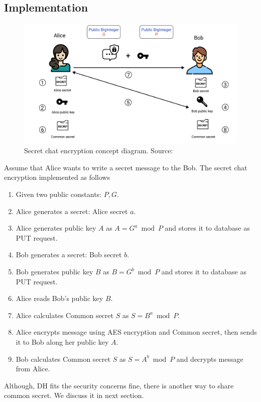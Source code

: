 \subsection{Implementation}\label{subsec:implementation}
\begin{figure}[H]
    \centering
    \includegraphics[width=1\textwidth]{Pictures/Key_Exchange}
    \caption{Secret chat encryption concept diagram. Source: }\label{fig:figure7}
\end{figure}
Assume that Alice wants to write a secret message to the Bob.
The secret chat encryption implemented as follows
\begin{enumerate}
    \item Given two public constants: $P, G$.
    \item Alice generates a secret: Alice secret $a$.
    \item Alice generates public key $A$ as $A=G^a \bmod P$ and stores it to database as PUT request.
    \item Bob generates a secret: Bob secret $b$.
    \item Bob generates public key $B$ as $B=G^b \bmod P$ and stores it to database as PUT request.
    \item Alice reads Bob's public key $B$.
    \item Alice calculates Common secret $S$ as $S = B^a \bmod P$.
    \item Alice encrypts message using AES encryption and Common secret, then sends it to Bob along her public key $A$.
    \item Bob calculates Common secret $S$ as $S = A^b \bmod P$ and decrypts message from Alice.
\end{enumerate}
Although, DH fits the security concerns fine, there is another way to share common secret.
We discuss it in next section.